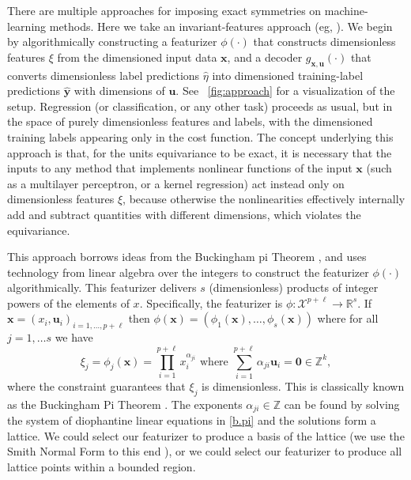 \documentclass[nohyperref]{article}
\theoremstyle{plain}
\theoremstyle{definition}
\theoremstyle{remark}
\newcommand{\figref}[1]{\figurename~\ref{#1}}
\begin{document}
There are multiple approaches for imposing exact symmetries on machine-learning methods. Here we take an invariant-features approach (eg, \citealt{villar}).
We begin by algorithmically constructing a featurizer $\phi(\cdot)$ that constructs  dimensionless features $\xi$ from the dimensioned input data $\mathbf x$, and a decoder $g_{\mathbf x, \mathbf u}(\cdot)$ that converts dimensionless label predictions $\hat{\eta}$ into dimensioned training-label predictions $\hat{\mathbf y}$ with dimensions of $\mathbf u$.
See \figref{fig:approach} for a visualization of the setup.
Regression (or classification, or any other task) proceeds as usual, but in the space of purely dimensionless features and labels, with the dimensioned training labels appearing only in the cost function.
The concept underlying this approach is that, for the units equivariance to be exact, it is necessary that the inputs to any method that implements nonlinear functions of the input $\mathbf x$ (such as a multilayer perceptron, or a kernel regression) act instead only on dimensionless features $\xi$, because otherwise the nonlinearities effectively internally add and subtract quantities with different dimensions, which violates the equivariance.

This approach borrows ideas from the Buckingham pi Theorem \cite{buckingham}, and uses technology from linear algebra over the integers \cite{smithnormalform} to construct the featurizer $\phi(\cdot)$ algorithmically.
This featurizer delivers $s$ (dimensionless) products of integer powers of the elements of $x$.
Specifically,  the featurizer is $\phi:\mathcal X^{p+\ell} \to \mathbb R^s$. If $\mathbf x=(x_i, \mathbf u_i)_{i=1, \ldots, p+\ell}$ then $\phi(\mathbf x) =(\phi_1(\mathbf x), \ldots, \phi_s(\mathbf x))$ where for all $j=1,\ldots s$ we have 
\begin{equation} \label{b.pi}
\xi_j=\phi_j(\mathbf x)= \prod_{i=1}^{p+\ell} x_i^{\alpha_{ji}} \text{ where }  \sum_{i=1}^{p+\ell} \alpha_{ji} \mathbf u_i =\mathbf 0 \in \mathbb Z^k,
\end{equation}
where the constraint guarantees that $\xi_j$ is dimensionless. This is classically known as the Buckingham Pi Theorem \cite{}. The exponents $\alpha_{ji} \in \mathbb Z$ can be found by solving the system of diophantine linear equations in \eqref{b.pi} and the solutions form a lattice. We could select our featurizer to produce a basis of the lattice (we use the Smith Normal Form to this end \cite{}), or we could select our featurizer to produce all lattice points within a bounded region. 
\end{document}
